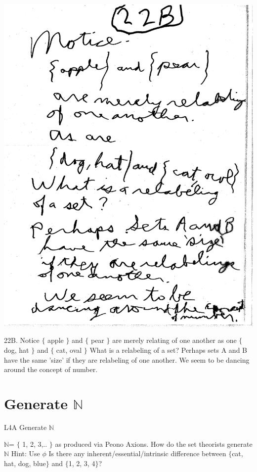 \documentclass[10pt,a4paper]{article}
\begin{document}
\includegraphics[scale=.5]{Pages/Page_22B}

22B. Notice $\{$ apple $\}$ and $\{$ pear $\}$ are merely relating of one another as one $\{$ dog, hat $\}$ and $\{$ cat, oval $\}$ What is a relabeling of a set? Perhaps sets A and B have the same 'size' if they are relabeling of one another. We seem to be dancing around the concept of number. 

\section{Generate $\mathbb{N}$}


\begin{Large}
L4A Generate $\mathbb{N}$
\end{Large}

\textit{$\mathbb{N}$}= $\lbrace$ 1, 2, 3,.. $\rbrace$ as produced via Peono Axions. How do the set theorists generate $\mathbb{N}$ Hint: Use 
$\phi$ Is there any inherent/essential/intrinsic difference between $\lbrace$cat, hat, dog, blue$\rbrace$ and $\lbrace$1, 2, 3, 4$\rbrace$?
\end{document}
